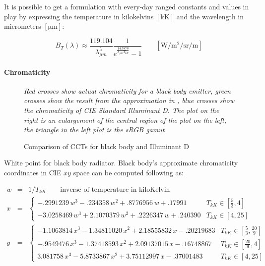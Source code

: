 It is possible to get a formulation with every-day ranged constants and values in play by expressing the temperature in kilokelvins $[\unit{\kilo\kelvin}]$ and the wavelength in micrometers $[\unit{\micro\meter}]$:

\begin{equation}
B_T(\lambda) \approx \frac{119.104}{\lambda_{\mu m}^5} \frac
1{e^{\frac{14.3878}{\lambda_{\mu m} T_{kK}}}-1}
\qquad \left[\unit{\watt\per\square\meter\per\steradian\per\meter}\right]
\end{equation}

\paragraph{Chromaticity}

\begin{figure}
{
\centering
\begin{minipage}{.4\linewidth}
\resizebox{\linewidth}{!}{}
\end{minipage}\hfill
\begin{minipage}{.4\linewidth}
\resizebox{\linewidth}{!}{}
\end{minipage}

\caption{Comparison of CCTs for black body and Illuminant D}
\label{fig:blackbodychroma}
}
\vskip 1mm
{\footnotesize\it Red crosses show actual chromaticity for a black body
emitter, green crosses show the result from the approximation in
\cite{kang02}, blue crosses show the chromaticity of CIE Standard
Illuminant D. The plot on the right is an enlargement of the
central region of the plot on the left, the triangle in the left plot
is the sRGB gamut}
\end{figure}

White point for black body radiator. Black body's approximate chromaticity
coordinates in CIE $xy$ space can be computed following \cite{kang02} as:

\begin{equation}
\begin{array}{rcll}
w & = & 1/T_{kK} \qquad \text{inverse of temperature in kiloKelvin} & \\
x & = & \begin{cases}
     - .2991239\,w^3 -  .234358 \,w^2  +  .8776956\,w  + .17991  & T_{kK} \in [\frac{5}{3}, 4] \\
     -3.0258469\,w^3 + 2.1070379\,w^2  +  .2226347\,w  + .240390 & T_{kK} \in [4, 25]
    \end{cases} \\
y & = & \begin{cases}
     -1.1063814\,x^3 - 1.34811020\,x^2 + 2.18555832\,x - .20219683 & T_{kK} \in [\frac{5}{3}, \frac{20}{9}] \\
     - .9549476\,x^3 - 1.37418593\,x^2 + 2.09137015\,x - .16748867 & T_{kK} \in [\frac{20}{9}, 4] \\
      3.081758 \,x^3 - 5.8733867 \,x^2 + 3.75112997\,x - .37001483 & T_{kK} \in [4, 25]
      \end{cases}
\end{array}
\end{equation}


